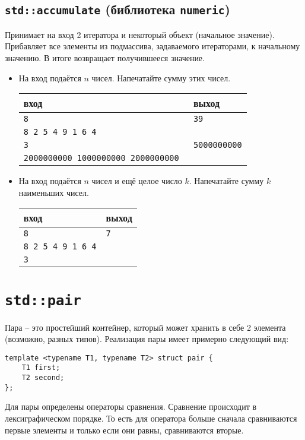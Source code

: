 \documentclass{article}
\begin{document}
\subsection*{\texttt{std::accumulate} (библиотека \texttt{numeric})}
Принимает на вход 2 итератора и некоторый объект (начальное значение). Прибавляет все элементы из подмассива, задаваемого итераторами, к начальному значению. В итоге возвращает получившееся значение.
\begin{itemize}
\item На вход подаётся $n$ чисел. Напечатайте сумму этих чисел.
\begin{center}
\begin{tabular}{ l | l }
 вход & выход \\ \hline
 \texttt{8} & \texttt{39}  \\ 
 \texttt{8 2 5 4 9 1 6 4} &  \\ \hline
 \texttt{3} & \texttt{5000000000}  \\ 
 \texttt{2000000000 1000000000 2000000000 } &  \\
\end{tabular}
\end{center}

\item На вход подаётся $n$ чисел и ещё целое число $k$. Напечатайте сумму $k$ наименьших чисел.
\begin{center}
\begin{tabular}{ l | l }
 вход & выход \\ \hline
 \texttt{8} & \texttt{7}  \\ 
 \texttt{8 2 5 4 9 1 6 4} &  \\
 \texttt{3} &\\
\end{tabular}
\end{center}
\end{itemize}

\newpage
\section*{\texttt{std::pair}}
Пара -- это простейший контейнер, который может хранить в себе 2 элемента (возможно, разных типов). Реализация пары имеет примерно следующий вид:
\begin{lstlisting}
template <typename T1, typename T2> struct pair {
    T1 first;
    T2 second;
};
\end{lstlisting}
Для пары определены операторы сравнения. Сравнение происходит в лексиграфическом порядке. То есть для оператора больше сначала сравниваются первые элементы и только если они равны, сравниваются вторые.\\
\end{document}
